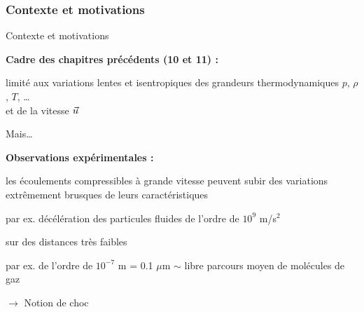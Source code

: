 \subsubsection{Contexte et motivations}
\begin{frame}{Contexte et motivations}

\small

\textbf{Cadre des chapitres précédents (10 et 11) :} \medskip

limité aux variations lentes et isentropiques
des grandeurs thermodynamiques $p$, $\rho$, $T$, \ldots \\ 
et de la vitesse $\vec{u}$

\vspace{3mm}

Mais\ldots \pause

\vspace{3mm}

\textbf{Observations expérimentales :} \medskip

les écoulements compressibles à grande vitesse peuvent subir des variations extrêmement 
brusques de leurs caractéristiques

\smallskip
\hspace{5mm}
{\color{gris} \checkmark \; par ex. décélération des particules fluides de l'ordre de $10^9$ m/s$^2$}

\pause

\smallskip
sur des distances très faibles

\smallskip
\hspace{5mm}
{\color{gris} \checkmark \; 
par ex. de l'ordre de $10^{-7}$ m = 0.1 $\mu$m $\sim$ libre parcours moyen de molécules de gaz}

\vspace{7mm}

\begin{center}
	\color{vert} $\rightarrow$  \; Notion de choc
\end{center}

\vspace{5mm}

\end{frame}

